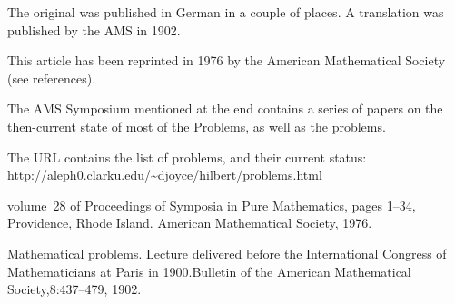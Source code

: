 The original was published in German in a couple of places.  A
translation was published by the AMS in 1902.
%
%

This article has been reprinted in 1976 by the American Mathematical
Society (see references).

The AMS Symposium mentioned at the end contains a series of papers on
the then-current state of most of the Problems, as well as the problems.

The URL contains the list of problems, and their current status:
\url{http://aleph0.clarku.edu/~djoyce/hilbert/problems.html}





    {volume~28 of Proceedings of Symposia in Pure Mathematics,} {pages
    1--34, Providence, Rhode Island. American Mathematical Society,
    1976.}

  {Mathematical problems. Lecture delivered before
    the International Congress of Mathematicians at Paris in
    1900.}{Bulletin of the American Mathematical Society,}{8:437--479,
    1902.}

